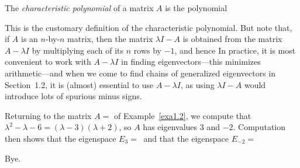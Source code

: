 \begin{definition}
\label{def1.3}
The \textit{characteristic polynomial}
%
of a matrix $A$ is the polynomial 
\end{definition}

\begin{remark}
\label{rem1.4}
This is the customary definition of the characteristic
%
polynomial.
But note that, if $A$ is an $n$-by-$n$ matrix, then the matrix
$\lambda I - A$ is obtained from the matrix $A - \lambda I$ by multiplying
each of its $n$ rows by $-1$, and hence
In practice, it is most convenient
to work with $A -\lambda I$ in finding eigenvectors---this minimizes
arithmetic---and when we come to find
chains of generalized eigenvectors in
Section~1.2,
it is (almost) essential to use $A -\lambda I$, as using
$\lambda I - A$ would introduce lots of spurious minus signs.
\end{remark}

\begin{example}
\label{exa1.5}
Returning to the matrix $A =$
of Example~\ref{exa1.2}, we compute that 
$\lambda^2 - \lambda - 6 = (\lambda - 3)(\lambda + 2)$, so $A$ has eigenvalues
$3$ and $-2$.
Computation then shows that the eigenspace
$E_{3} = \ $
and that the eigenspace
$E_{-2} = \ $
\end{example}

Bye.
